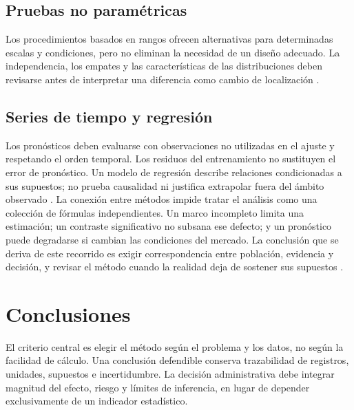 {\subsection{Pruebas no paramétricas}
Los procedimientos basados en rangos ofrecen alternativas para determinadas escalas y condiciones, pero no eliminan la necesidad de un diseño adecuado. La independencia, los empates y las características de las distribuciones deben revisarse antes de interpretar una diferencia como cambio de localización \citep{nistHandbook}.
\subsection{Series de tiempo y regresión}
Los pronósticos deben evaluarse con observaciones no utilizadas en el ajuste y respetando el orden temporal. Los residuos del entrenamiento no sustituyen el error de pronóstico. Un modelo de regresión describe relaciones condicionadas a sus supuestos; no prueba causalidad ni justifica extrapolar fuera del ámbito observado \citep{hyndmanForecasting2021}.
La conexión entre métodos impide tratar el análisis como una colección de fórmulas independientes. Un marco incompleto limita una estimación; un contraste significativo no subsana ese defecto; y un pronóstico puede degradarse si cambian las condiciones del mercado. La conclusión que se deriva de este recorrido es exigir correspondencia entre población, evidencia y decisión, y revisar el método cuando la realidad deja de sostener sus supuestos \citep{holmesBusiness2023,nistHandbook,hyndmanForecasting2021}.
\section{Conclusiones}
El criterio central es elegir el método según el problema y los datos, no según la facilidad de cálculo. Una conclusión defendible conserva trazabilidad de registros, unidades, supuestos e incertidumbre. La decisión administrativa debe integrar magnitud del efecto, riesgo y límites de inferencia, en lugar de depender exclusivamente de un indicador estadístico.
}

